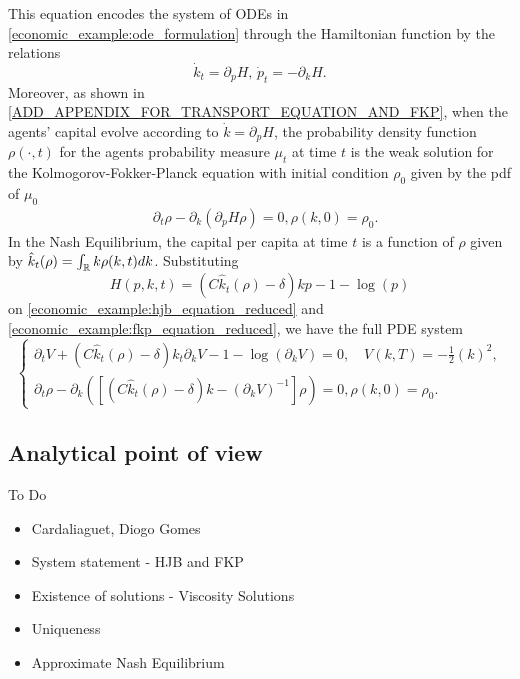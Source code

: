\documentclass{article}
\begin{document}
This equation encodes the system of ODEs in \ref{economic_example:ode_formulation} through the Hamiltonian function by the relations
\begin{equation*}
    \dot k_t = \partial_p H,\, \dot p_t = -\partial_k H.
\end{equation*}
Moreover, as shown in \ref{ADD_APPENDIX_FOR_TRANSPORT_EQUATION_AND_FKP},
when the agents' capital evolve according to $\dot k = \partial_p H$,
the probability density function $\rho(\cdot, t)$ for the agents probability measure $\mu_t$ at time $t$
is the weak solution for the Kolmogorov-Fokker-Planck equation with initial condition $\rho_0$ given by the pdf of $\mu_0$
\begin{equation}\label{economic_example:fkp_equation_reduced}
\begin{split}
    &\partial_t \rho - \partial_k \left( \partial_p H \rho \right) = 0, \rho(k,0) = \rho_0.
\end{split}
\end{equation}
In the Nash Equilibrium, the capital per capita at time $t$ is a function of $\rho$ given by $\hat k_t(\rho) = \int_{\mathbb{R}} k \rho(k,t) dk$.
Substituting 
\begin{equation*}
    H(p,k,t) = \left(C {\hat k_t(\rho) - \delta}\right)k p  - 1  - \log(p)
\end{equation*}
on \ref{economic_example:hjb_equation_reduced} and \ref{economic_example:fkp_equation_reduced}, we have the full PDE system
\begin{equation}
    \begin{cases}
        \partial_t V +  \left(C {\hat k_t(\rho) - \delta}\right)k_t \partial_k V - 1  - \log(\partial_k V) = 0,\quad V(k,T) = -\frac{1}{2}(k)^2,\\
        \partial_t \rho - \partial_k \left( \left[ \left(C {\hat k_t}(\rho) - \delta\right) k - (\partial_k V)^{-1} \right]\rho \right) = 0, \rho(k,0) = \rho_0.
    \end{cases}
\end{equation}
\color{black}




\subsection{Analytical point of view}

To Do
\begin{itemize}
    \item Cardaliaguet, Diogo Gomes
    \item System statement - HJB and FKP
    \item Existence of solutions - Viscosity Solutions
    \item Uniqueness
    \item Approximate Nash Equilibrium
\end{itemize}
\end{document}
